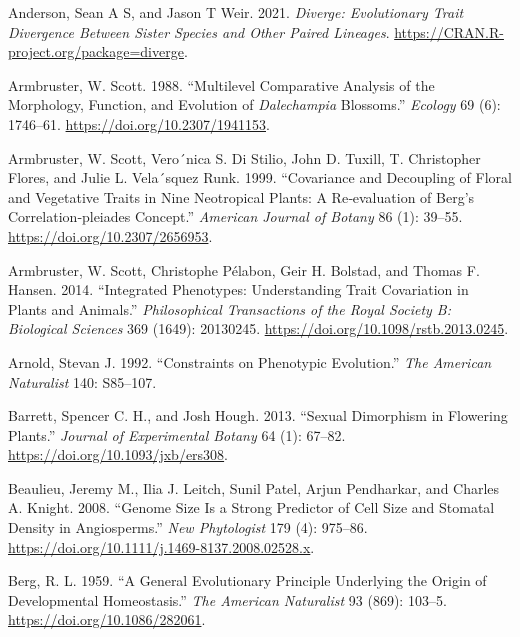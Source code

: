 \documentclass[
  12pt,
]{article}
\newlength{\cslhangindent}
\newlength{\cslentryspacingunit} %
\newenvironment{CSLReferences}[2] %
 {%
  \setlength{\parindent}{0pt}
  \ifodd #1
  \let\oldpar\par
  \def\par{\hangindent=\cslhangindent\oldpar}
  \fi
  \setlength{\parskip}{#2\cslentryspacingunit}
 }%
 {}
\begin{document}
\hypertarget{refs}{}
\begin{CSLReferences}{1}{0}
\leavevmode{}%
Anderson, Sean A S, and Jason T Weir. 2021. \emph{Diverge: {Evolutionary} {Trait} {Divergence} {Between} {Sister} {Species} and {Other} {Paired} {Lineages}}. \url{https://CRAN.R-project.org/package=diverge}.

\leavevmode{}%
Armbruster, W. Scott. 1988. {``Multilevel {Comparative} {Analysis} of the {Morphology}, {Function}, and {Evolution} of \emph{Dalechampia} {Blossoms}.''} \emph{Ecology} 69 (6): 1746--61. \url{https://doi.org/10.2307/1941153}.

\leavevmode{}%
Armbruster, W. Scott, Vero´nica S. Di Stilio, John D. Tuxill, T. Christopher Flores, and Julie L. Vela´squez Runk. 1999. {``Covariance and Decoupling of Floral and Vegetative Traits in Nine {Neotropical} Plants: A Re‐evaluation of {Berg}'s Correlation‐pleiades Concept.''} \emph{American Journal of Botany} 86 (1): 39--55. \url{https://doi.org/10.2307/2656953}.

\leavevmode{}%
Armbruster, W. Scott, Christophe Pélabon, Geir H. Bolstad, and Thomas F. Hansen. 2014. {``Integrated Phenotypes: Understanding Trait Covariation in Plants and Animals.''} \emph{Philosophical Transactions of the Royal Society B: Biological Sciences} 369 (1649): 20130245. \url{https://doi.org/10.1098/rstb.2013.0245}.

\leavevmode{}%
Arnold, Stevan J. 1992. {``Constraints on Phenotypic Evolution.''} \emph{The American Naturalist} 140: S85--107.

\leavevmode{}%
Barrett, Spencer C. H., and Josh Hough. 2013. {``Sexual Dimorphism in Flowering Plants.''} \emph{Journal of Experimental Botany} 64 (1): 67--82. \url{https://doi.org/10.1093/jxb/ers308}.

\leavevmode{}%
Beaulieu, Jeremy M., Ilia J. Leitch, Sunil Patel, Arjun Pendharkar, and Charles A. Knight. 2008. {``Genome Size Is a Strong Predictor of Cell Size and Stomatal Density in Angiosperms.''} \emph{New Phytologist} 179 (4): 975--86. \url{https://doi.org/10.1111/j.1469-8137.2008.02528.x}.

\leavevmode{}%
Berg, R. L. 1959. {``A {General} {Evolutionary} {Principle} {Underlying} the {Origin} of {Developmental} {Homeostasis}.''} \emph{The American Naturalist} 93 (869): 103--5. \url{https://doi.org/10.1086/282061}.


\end{CSLReferences}
\end{document}
